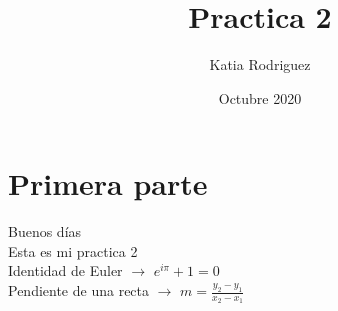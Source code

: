 \documentclass[a4paper,10pt]{article}
\title{Practica 2} %
\author{Katia Rodriguez} %
\date{Octubre 2020}
\begin{document}
\maketitle

% 

\section{Primera parte}

Buenos días \\ %

Esta es mi practica 2 \\ %

\centering Identidad de Euler $\longrightarrow$ $ e^{i \pi} + 1 = 0 $ \\ %

Pendiente de una recta $\longrightarrow$ $m=\frac{y_2-y_1}{x_2-x_1}$
\end{document}
